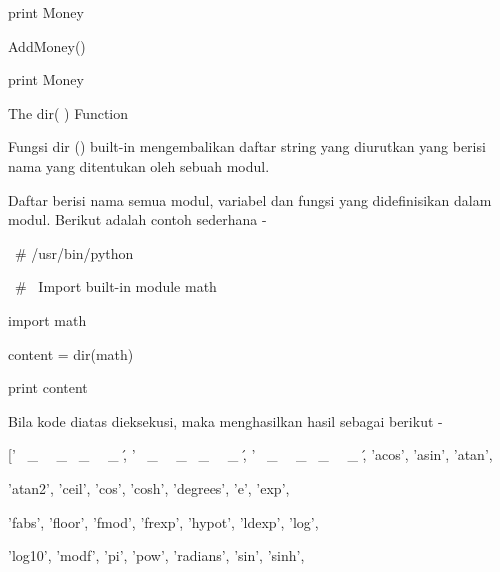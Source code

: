 \vspace{12pt}
\noindent 
 \hspace*{0.5in} print Money \par
\noindent 
 \hspace*{0.5in} AddMoney() \par
\noindent 
 \hspace*{0.5in} print Money \par
\vspace{12pt}
\noindent 
The dir( ) Function \par
\noindent 
Fungsi dir () built-in mengembalikan daftar string yang diurutkan yang berisi nama yang ditentukan oleh sebuah modul. \par
\noindent 
Daftar berisi nama semua modul, variabel dan fungsi yang didefinisikan dalam modul. Berikut adalah contoh sederhana - \par
\noindent 
 \hspace*{0.5in}  \  \#  \!/usr/bin/python \par
\vspace{12pt}
\noindent 
 \hspace*{0.5in}  \  \#  \ Import built-in module math \par
\noindent 
 \hspace*{0.5in} import math \par
\vspace{12pt}
\noindent 
 \hspace*{0.5in} content = dir(math) \par
\vspace{12pt}
\noindent 
 \hspace*{0.5in} print content \par
\noindent 
Bila kode diatas dieksekusi, maka menghasilkan hasil sebagai berikut - \par
\noindent 
 \hspace*{0.5in} [' \  \_  \ \  \_  \doc \  \_  \ \  \_  \', ' \  \_  \ \  \_  \file \  \_  \ \  \_  \', ' \  \_  \ \  \_  \name \  \_  \ \  \_  \', 'acos', 'asin', 'atan',  \par
\noindent 
 \hspace*{0.5in} 'atan2', 'ceil', 'cos', 'cosh', 'degrees', 'e', 'exp',  \par
\noindent 
 \hspace*{0.5in} 'fabs', 'floor', 'fmod', 'frexp', 'hypot', 'ldexp', 'log', \par
\noindent 
 \hspace*{0.5in} 'log10', 'modf', 'pi', 'pow', 'radians', 'sin', 'sinh',  \par
